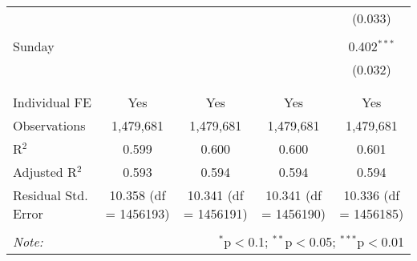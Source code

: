 \documentclass[
]{article}
\begin{document}
\begin{table}[!htbp]
{\begin{tabular}{@{\extracolsep{5pt}}lcccc}
  &  &  &  & (0.033) \\ 
  & & & & \\ 
 Sunday &  &  &  & 0.402$^{***}$ \\ 
  &  &  &  & (0.032) \\ 
  & & & & \\ 
\hline \\[-1.8ex] 
Individual FE & Yes & Yes & Yes & Yes \\ 
Observations & 1,479,681 & 1,479,681 & 1,479,681 & 1,479,681 \\ 
R$^{2}$ & 0.599 & 0.600 & 0.600 & 0.601 \\ 
Adjusted R$^{2}$ & 0.593 & 0.594 & 0.594 & 0.594 \\ 
Residual Std. Error & 10.358 (df = 1456193) & 10.341 (df = 1456191) & 10.341 (df = 1456190) & 10.336 (df = 1456185) \\ 
\hline 
\hline \\[-1.8ex] 
\textit{Note:}  & \multicolumn{4}{r}{$^{*}$p$<$0.1; $^{**}$p$<$0.05; $^{***}$p$<$0.01} \\ 
\end{tabular}
} 
\end{table} 
\newpage
\end{document}
